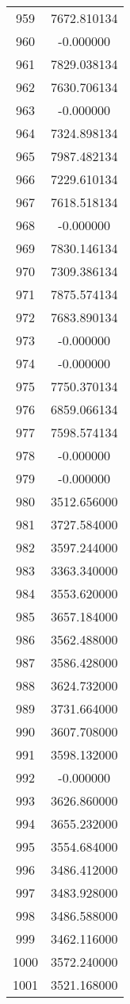 \documentclass[12pt]{article}
\begin{document}
\begin{longtable}{@{}cc@{}}
959 & 7672.810134 \\
960 & -0.000000 \\
961 & 7829.038134 \\
962 & 7630.706134 \\
963 & -0.000000 \\
964 & 7324.898134 \\
965 & 7987.482134 \\
966 & 7229.610134 \\
967 & 7618.518134 \\
968 & -0.000000 \\
969 & 7830.146134 \\
970 & 7309.386134 \\
971 & 7875.574134 \\
972 & 7683.890134 \\
973 & -0.000000 \\
974 & -0.000000 \\
975 & 7750.370134 \\
976 & 6859.066134 \\
977 & 7598.574134 \\
978 & -0.000000 \\
979 & -0.000000 \\
980 & 3512.656000 \\
981 & 3727.584000 \\
982 & 3597.244000 \\
983 & 3363.340000 \\
984 & 3553.620000 \\
985 & 3657.184000 \\
986 & 3562.488000 \\
987 & 3586.428000 \\
988 & 3624.732000 \\
989 & 3731.664000 \\
990 & 3607.708000 \\
991 & 3598.132000 \\
992 & -0.000000 \\
993 & 3626.860000 \\
994 & 3655.232000 \\
995 & 3554.684000 \\
996 & 3486.412000 \\
997 & 3483.928000 \\
998 & 3486.588000 \\
999 & 3462.116000 \\
1000 & 3572.240000 \\
1001 & 3521.168000 \\

\end{longtable}
\end{document}

